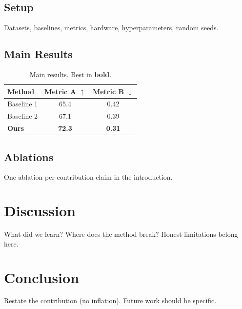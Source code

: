\documentclass[letterpaper]{article} %
\begin{document}
\subsection{Setup}
Datasets, baselines, metrics, hardware, hyperparameters, random seeds.

\subsection{Main Results}
\begin{table}[t]
\centering
\caption{Main results. Best in \textbf{bold}.}
\label{tab:main}
\begin{tabular}{lcc}
\toprule
Method & Metric A $\uparrow$ & Metric B $\downarrow$ \\
\midrule
Baseline 1 & 65.4 & 0.42 \\
Baseline 2 & 67.1 & 0.39 \\
\textbf{Ours} & \textbf{72.3} & \textbf{0.31} \\
\bottomrule
\end{tabular}
\end{table}

\subsection{Ablations}
One ablation per contribution claim in the introduction.


\section{Discussion}

What did we learn? Where does the method break? Honest limitations belong
here.

\section{Conclusion}

Restate the contribution (no inflation). Future work should be specific.

%


\end{document}
